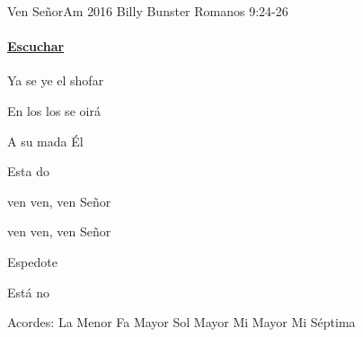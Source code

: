 \documentclass[12pt, spanish]{book}
\newcommand{\NotCCLIed}{\relax}
\begin{document}
    \begin{song}{Ven Señor}{Am}
    {2016} %
    {Billy Bunster}
    {Romanos 9:24-26} %
    {} %
        \ifChordBk
        \paragraph{\mbox{}\hfill\protect\href{https://open.spotify.com/intl-es/track/4uscBcDe06nHSggg9a546a}{Escuchar}\mbox{}\hfill}
        \fi


        \begin{SBOpGroup}
            Ya se ye el shofar

            En los los se oirá

            A su mada Él

            Esta do
        \end{SBOpGroup}

        \begin{SBChorus}
             ven ven, ven Señor

             ven ven, ven Señor

            Espedote

            Está  no
        \end{SBChorus}

        \ifChordBk
        \begin{SBOpGroup}
            Acordes:
            \upchord{\Am}\qquad La Menor \hfill
            \upchord{\F}\qquad Fa Mayor \hfill\null\break
            \upchord{\G}\qquad Sol Mayor \hfill
            \upchord{\E}\qquad Mi Mayor \hfill\null\break
            \upchord{\Eseven}\qquad Mi S\'eptima \hfill
        \end{SBOpGroup}
        \fi
    \end{song}
\end{document}
